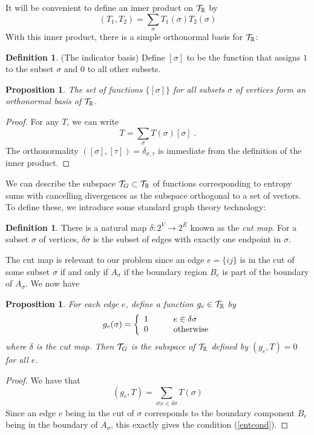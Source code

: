 \documentclass[12pt]{article}
\newtheorem{proposition}[theorem]{Proposition}
\theoremstyle{definition}
\newtheorem{definition}[theorem]{Definition}
\begin{document}
It will be convenient to define an inner product on ${\cal T}_\mathbb{R}$ by
\begin{equation}
\label{inner}
(T_1,T_2) = \sum_{\sigma} T_1(\sigma) T_2(\sigma)
\end{equation}
With this inner product, there is a simple orthonormal basis for ${\cal T}_\mathbb{R}$:
\begin{definition} (The indicator basis)
Define $[\sigma]$ to be the function that assigns $1$ to the subset $\sigma$ and $0$ to all other subsets. 
\label{def:indicator}
\end{definition}
\begin{proposition}
The set of functions $\{[\sigma]\}$ for all subsets $\sigma$ of vertices form an orthonormal basis of ${\cal T}_\mathbb{R}$.
\end{proposition}
\begin{proof}
   For any $T$, we can write
\[
T = \sum_\sigma T(\sigma) [\sigma] \; .
\]
The orthonormality $([\sigma],[\tau]) = \delta_{\sigma,\tau}$ is immediate from the definition of the inner product.
\end{proof}
We can describe the subspace ${\cal T}_G \subset {\cal T}_\mathbb{R}$ of functions corresponding to entropy sums with cancelling divergences as the subspace orthogonal to a set of vectors. To define these, we introduce some standard graph theory technology: 
\begin{definition}
There is a natural map $\delta: 2^V \to 2^E$ known as the {\it cut map}. For a subset $\sigma$ of vertices, $\delta \sigma$ is the subset of edges with exactly one endpoint in $\sigma$. 
\end{definition}
The cut map is relevant to our problem since an edge $e = \{ij\}$ is in the cut of some subset $\sigma$ if and only if $A_\sigma$ if the  boundary region $B_e$ is part of the boundary of $A_\sigma$. We now have
\begin{proposition}
\label{inner}
    For each edge $e$, define a function $g_e \in {\cal T}_\mathbb{R}$ by 
    \[
    g_e(\sigma) = \left\{ \begin{array}{ll} 1 & \qquad e \in \delta \sigma \cr
    0 & \qquad {\rm otherwise} \end{array} \right.
    \]
    where $\delta$ is the cut map. Then ${\cal T}_G$ is the subspace of ${\cal T}_\mathbb{R}$ defined by $(g_e,T) = 0$ for all $e$.
\end{proposition}
\begin{proof}
   We have that 
   \[
   (g_e, T) = \sum_{\sigma | e \in \delta \sigma} T(\sigma)
   \]
   Since an edge $e$ being in the cut of $\sigma$ corresponds to the boundary component $B_e$ being in the boundary of $A_\sigma$, this exactly gives the  condition (\ref{entcond}).
\end{proof}
\end{document}
